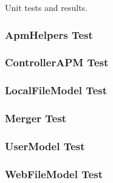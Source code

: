 Unit tests and results.

\subsubsection{ApmHelpers Test}

\subsubsection{ControllerAPM Test}

\subsubsection{LocalFileModel Test}

\subsubsection{Merger Test}

\subsubsection{UserModel Test}

\subsubsection{WebFileModel Test}